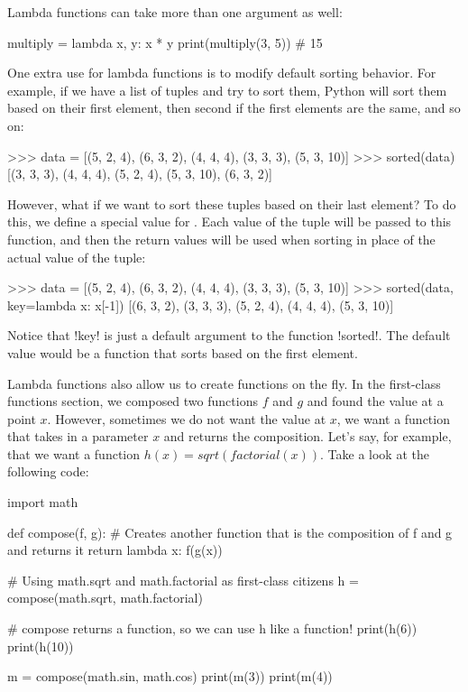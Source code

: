 \documentclass[11pt]{cselabheader}
\begin{document}
Lambda functions can take more than one argument as well:
\begin{python3code}
multiply = lambda x, y: x * y
print(multiply(3, 5)) # 15
\end{python3code}

One extra use for lambda functions is to modify default sorting behavior. For
example, if we have a list of tuples and try to sort them, Python will sort them
based on their first element, then second if the first elements are the same,
and so on:

\begin{pyconcode}
>>> data = [(5, 2, 4), (6, 3, 2), (4, 4, 4), (3, 3, 3), (5, 3, 10)]
>>> sorted(data)
[(3, 3, 3), (4, 4, 4), (5, 2, 4), (5, 3, 10), (6, 3, 2)]
\end{pyconcode}

However, what if we want to sort these tuples based on their last element? To do
this, we define a special  value for . Each
value of the tuple will be passed to this function, and then the return values
will be used when sorting in place of the actual value of the tuple:

\begin{pyconcode}
>>> data = [(5, 2, 4), (6, 3, 2), (4, 4, 4), (3, 3, 3), (5, 3, 10)]
>>> sorted(data, key=lambda x: x[-1])
[(6, 3, 2), (3, 3, 3), (5, 2, 4), (4, 4, 4), (5, 3, 10)]
\end{pyconcode}

Notice that \pythoninline!key! is just a default argument to the function 
\pythoninline!sorted!. The default value would be a function that sorts based on
the first element.

Lambda functions also allow us to create functions on the fly. In the
first-class functions section, we composed two functions $f$ and $g$ and found
the value at a point $x$. However, sometimes we do not want the value at $x$, we
want a function that takes in a parameter $x$ and returns the composition. Let's
say, for example, that we want a function $h(x) = sqrt(factorial(x))$. Take
a look at the following code:
\begin{python3code}
import math

def compose(f, g):
  # Creates another function that is the composition of f and g and returns it
  return lambda x: f(g(x))

# Using math.sqrt and math.factorial as first-class citizens
h = compose(math.sqrt, math.factorial)

# compose returns a function, so we can use h like a function!
print(h(6))
print(h(10))

m = compose(math.sin, math.cos)
print(m(3))
print(m(4))
\end{python3code}
\end{document}
